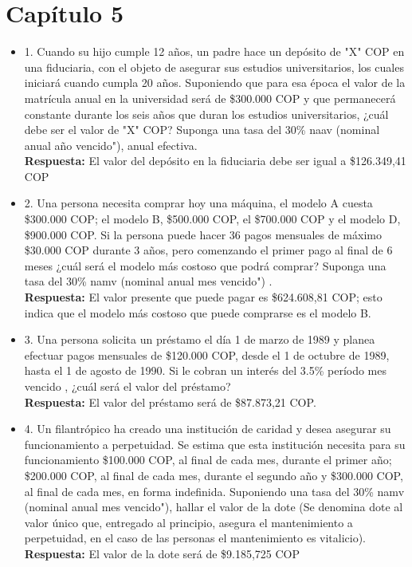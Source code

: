 \chapter*{Capítulo 5}



\begin{itemize}

 \item 1. Cuando su hijo cumple 12 años, un padre hace un depósito de "X" COP en una fiduciaria, con el objeto de asegurar sus estudios universitarios, los cuales iniciará cuando cumpla 20 años. Suponiendo que para esa época el valor de la matrícula anual en la universidad será de \$300.000 COP y que permanecerá constante durante los seis años que duran los estudios universitarios, ¿cuál debe ser el valor de "X" COP? Suponga una tasa del 30\% naav (nominal anual año vencido"), anual efectiva.\\
       \textbf{Respuesta:} El valor del depósito en la fiduciaria debe ser igual a \$126.349,41 COP\\
       \medskip

 \item 2. Una persona necesita comprar hoy una máquina, el modelo A cuesta \$300.000 COP; el modelo B, \$500.000 COP, el \$700.000 COP y el modelo D, \$900.000 COP. Si la persona puede hacer 36 pagos mensuales de máximo \$30.000 COP durante 3 años, pero comenzando el primer pago al final de 6 meses ¿cuál será el modelo más costoso que podrá comprar? Suponga una tasa del 30\% namv (nominal anual mes vencido") .\\
       \textbf{Respuesta:} El valor presente que puede pagar es \$624.608,81 COP; esto indica que el modelo más costoso que puede comprarse es el modelo B.\\
       \medskip

 \item 3. Una persona solicita un préstamo el día 1 de marzo de 1989 y planea efectuar pagos mensuales de \$120.000 COP, desde el 1 de octubre de 1989, hasta el 1 de agosto de 1990. Si le cobran un interés del 3.5\% período mes vencido , ¿cuál será el valor del préstamo?\\
      \textbf{Respuesta:} El valor del préstamo será de \$87.873,21 COP.\\
       \medskip

 \item 4. Un filantrópico ha creado una institución de caridad y desea asegurar su funcionamiento a perpetuidad. Se estima que esta institución necesita para su funcionamiento \$100.000 COP, al final de cada mes, durante el primer año; \$200.000 COP, al final de cada mes, durante el segundo año y \$300.000 COP, al final de cada mes, en forma indefinida. Suponiendo una tasa del 30\% namv (nominal anual mes vencido"), hallar el valor de la dote (Se denomina dote al valor único que, entregado al principio, asegura el mantenimiento a perpetuidad, en el caso de las personas el mantenimiento es vitalicio).\\
       \textbf{Respuesta:} El valor de la dote será de \$9.185,725 COP\\
       \medskip


\end{itemize}
